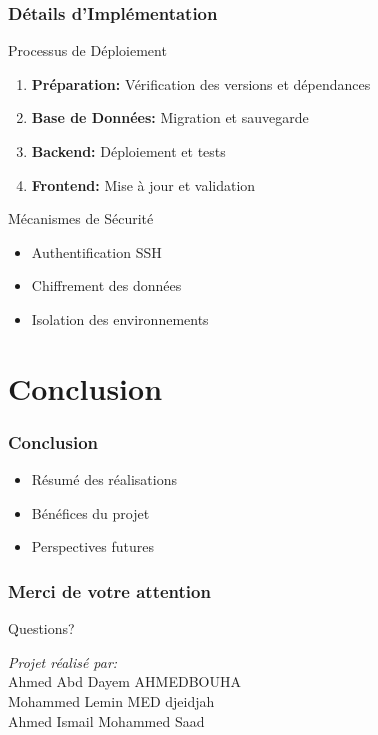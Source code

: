 \documentclass[aspectratio=169]{beamer}
\begin{document}
\begin{frame}
    \frametitle{Détails d'Implémentation}
    \begin{block}{Processus de Déploiement}
        \begin{enumerate}
            \item \textbf{Préparation:} Vérification des versions et dépendances
            \item \textbf{Base de Données:} Migration et sauvegarde
            \item \textbf{Backend:} Déploiement et tests
            \item \textbf{Frontend:} Mise à jour et validation
        \end{enumerate}
    \end{block}
    \pause
    \begin{block}{Mécanismes de Sécurité}
        \begin{itemize}
            \item Authentification SSH
            \item Chiffrement des données
            \item Isolation des environnements
        \end{itemize}
    \end{block}
\end{frame}

\section{Conclusion}
\begin{frame}
    \frametitle{Conclusion}
    \begin{itemize}
        \item Résumé des réalisations
        \item Bénéfices du projet
        \item Perspectives futures
    \end{itemize}
\end{frame}

\begin{frame}
    \frametitle{Merci de votre attention}
    \begin{center}
        \Large{Questions?}
        \vspace{1cm}
        
        \textit{Projet réalisé par:}\\
        \medskip
        Ahmed Abd Dayem AHMEDBOUHA\\
        Mohammed Lemin MED djeidjah\\
        Ahmed Ismail Mohammed Saad
    \end{center}
\end{frame}
\end{document}
